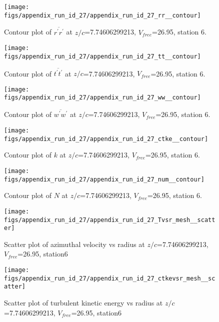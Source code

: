 \begin{figure}[H]
\centering
\texttt{[image: figs/appendix\_run\_id\_27/appendix\_run\_id\_27\_rr\_\_contour]}
\caption{Contour plot of $\overline{r^\prime r^\prime}$ at $z/c$=7.74606299213, $V_{free}$=26.95, station 6.}
\label{fig:appendix_run_id_27_rr__contour}
\end{figure}


\begin{figure}[H]
\centering
\texttt{[image: figs/appendix\_run\_id\_27/appendix\_run\_id\_27\_tt\_\_contour]}
\caption{Contour plot of $\overline{t^\prime t^\prime}$ at $z/c$=7.74606299213, $V_{free}$=26.95, station 6.}
\label{fig:appendix_run_id_27_tt__contour}
\end{figure}


\begin{figure}[H]
\centering
\texttt{[image: figs/appendix\_run\_id\_27/appendix\_run\_id\_27\_ww\_\_contour]}
\caption{Contour plot of $\overline{w^\prime w^\prime}$ at $z/c$=7.74606299213, $V_{free}$=26.95, station 6.}
\label{fig:appendix_run_id_27_ww__contour}
\end{figure}


\begin{figure}[H]
\centering
\texttt{[image: figs/appendix\_run\_id\_27/appendix\_run\_id\_27\_ctke\_\_contour]}
\caption{Contour plot of $k$ at $z/c$=7.74606299213, $V_{free}$=26.95, station 6.}
\label{fig:appendix_run_id_27_ctke__contour}
\end{figure}


\begin{figure}[H]
\centering
\texttt{[image: figs/appendix\_run\_id\_27/appendix\_run\_id\_27\_num\_\_contour]}
\caption{Contour plot of $N$ at $z/c$=7.74606299213, $V_{free}$=26.95, station 6.}
\label{fig:appendix_run_id_27_num__contour}
\end{figure}


\begin{figure}[H]
\centering
\texttt{[image: figs/appendix\_run\_id\_27/appendix\_run\_id\_27\_Tvsr\_mesh\_\_scatter]}
\caption{Scatter plot of azimuthal velocity vs radius at $z/c$=7.74606299213, $V_{free}$=26.95, station6}
\label{fig:appendix_run_id_27_Tvsr_mesh__scatter}
\end{figure}


\begin{figure}[H]
\centering
\texttt{[image: figs/appendix\_run\_id\_27/appendix\_run\_id\_27\_ctkevsr\_mesh\_\_scatter]}
\caption{Scatter plot of turbulent kinetic energy vs radius at $z/c$=7.74606299213, $V_{free}$=26.95, station6}
\label{fig:appendix_run_id_27_ctkevsr_mesh__scatter}
\end{figure}



